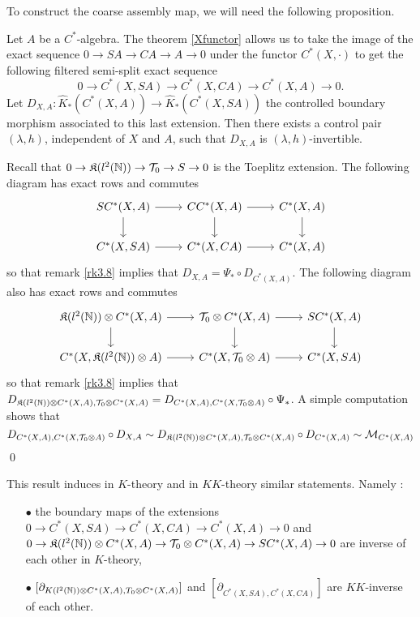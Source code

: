 To construct the coarse assembly map, we will need the following proposition.

\begin{prop}\label{InverseEven}
Let $A$ be a $C^*$-algebra. The theorem \ref{Xfunctor} allows us to take the image of the exact sequence $0 \rightarrow SA \rightarrow CA \rightarrow A \rightarrow 0 $ under the functor $C^*(X,\cdot)$ to get the following filtered semi-split exact sequence 
\[0 \rightarrow C^*(X,SA) \rightarrow C^*(X,CA) \rightarrow C^*(X,A) \rightarrow 0.\] 
Let $D_{X,A} : \hat K_*(C^*(X,A))\rightarrow \hat K_*(C^*(X,SA))$ the controlled boundary morphism associated to this last extension. Then there exists a control pair $(\lambda,h)$, independent of $X$ and $A$, such that $D_{X,A}$ is $(\lambda,h)$-invertible.
\end{prop}

\begin{dem}
Recall that $0\rightarrow \mathfrak K(l^2(\mathbb N)) \rightarrow \mathcal T_0\rightarrow S\rightarrow 0 $ is the Toeplitz extension. The following diagram has exact rows and commutes
\[\begin{tikzcd} 
SC^*(X,A) \arrow{d}\arrow{r} & CC^*(X,A) \arrow{d}\arrow{r} & C^*(X,A) \arrow{d} \\ 
C^*(X,SA) \arrow{r}          & C^*(X,CA) \arrow{r}          & C^*(X,A)
\end{tikzcd}\]
so that remark \ref{rk3.8} implies that $D_{X,A} = \Psi_*\circ D_{C^*(X,A)}$. The following diagram also has exact rows and commutes
\[\begin{tikzcd} 
\mathfrak K(l^2(\N))\otimes C^*(X,A) \arrow{d}\arrow{r} & \mathcal T_0 \otimes C^*(X,A) \arrow{d}\arrow{r} & SC^*(X,A) \arrow{d} \\ 
C^*(X,\mathfrak K(l^2(\N))\otimes A) \arrow{r}          & C^*(X,\mathcal T_0 \otimes A) \arrow{r}          & C^*(X,SA)
\end{tikzcd}\]
so that remark \ref{rk3.8} implies that $D_{\mathfrak K(l^2(\mathbb N))\otimes C^*(X,A),\mathcal T_0\otimes C^*(X,A)} = D_{C^*(X,A),C^*(X,\mathcal T_0\otimes A)}\circ\Psi_*$. A simple computation shows that 
\[D_{C^*(X,A),C^*(X,\mathcal T_0\otimes A)}\circ D_{X,A} \sim D_{\mathfrak K(l^2(\mathbb N))\otimes C^*(X,A),\mathcal T_0\otimes C^*(X,A)}\circ D_{C^*(X,A)} \sim \mathcal M_{C^*(X,A)}\]
\qed
\end{dem}

\begin{rk} This result induces in $K$-theory and in $KK$-theory similar statements. Namely : 
\begin{itemize}
\item[$\bullet$] the boundary maps of the extensions $0 \rightarrow C^*(X,SA) \rightarrow C^*(X,CA) \rightarrow C^*(X,A) \rightarrow 0$ and
$0 \rightarrow\mathfrak K(l^2(\mathbb N))\otimes C^*(X,A) \rightarrow \mathcal T_0 \otimes C^*(X,A) \rightarrow SC^*(X,A) \rightarrow 0$ are inverse of each other in $K$-theory,  
\item[$\bullet$] $[\partial_{K(l^2(\mathbb N))\otimes C^*(X,A), T_0 \otimes C^*(X,A)}]$ and $[\partial_{C^*(X,SA),C^*(X,CA)}]$ are $KK$-inverse of each other.
\end{itemize}
\end{rk}

